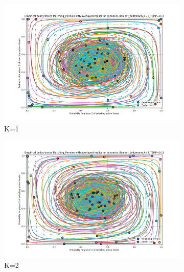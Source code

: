 \documentclass[12pt,a4paper, onecolumn]{exam}
\begin{document}
\begin{appendices}
    \begin{figure}[H]
        \centering
        \begin{subfigure}{0.44\textwidth}
            \centering
            \includegraphics[width=\linewidth]{plots/replicator_trajectoreis_Matching_Pennies_lenient_boltzmann_K=1_TEMP=0.1.png}
            \caption{K=1}
        \end{subfigure}
        \hfill
        \begin{subfigure}{0.44\textwidth}
            \centering
            \includegraphics[width=\linewidth]{plots/replicator_trajectoreis_Matching_Pennies_lenient_boltzmann_K=2_TEMP=0.1.png}
            \caption{K=2}
        \end{subfigure}
        \vspace{0.5cm}
        \begin{subfigure}{0.44\textwidth}
            \centering

\end{subfigure}
\end{figure}
\end{appendices}
\end{document}
